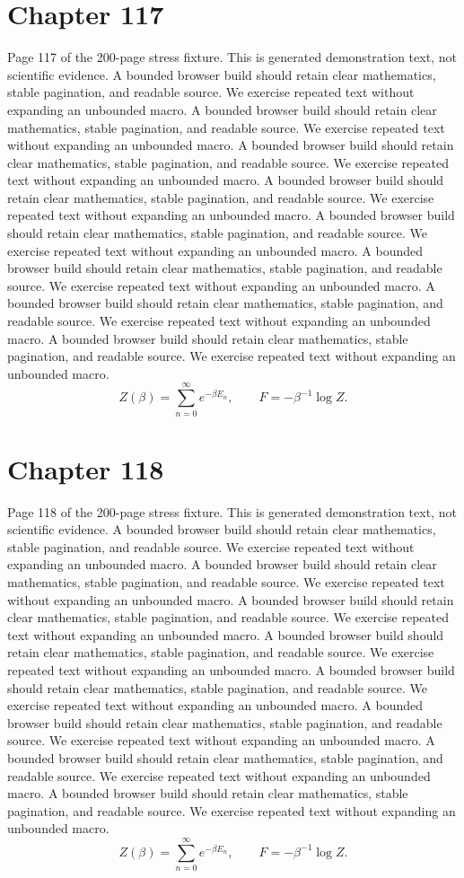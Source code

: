 \documentclass[11pt]{article}
\begin{document}
\section*{Chapter 117}
Page 117 of the 200-page stress fixture. This is generated demonstration text, not scientific evidence.
A bounded browser build should retain clear mathematics, stable pagination, and readable source. We exercise repeated text without expanding an unbounded macro.
A bounded browser build should retain clear mathematics, stable pagination, and readable source. We exercise repeated text without expanding an unbounded macro.
A bounded browser build should retain clear mathematics, stable pagination, and readable source. We exercise repeated text without expanding an unbounded macro.
A bounded browser build should retain clear mathematics, stable pagination, and readable source. We exercise repeated text without expanding an unbounded macro.
A bounded browser build should retain clear mathematics, stable pagination, and readable source. We exercise repeated text without expanding an unbounded macro.
A bounded browser build should retain clear mathematics, stable pagination, and readable source. We exercise repeated text without expanding an unbounded macro.
A bounded browser build should retain clear mathematics, stable pagination, and readable source. We exercise repeated text without expanding an unbounded macro.
A bounded browser build should retain clear mathematics, stable pagination, and readable source. We exercise repeated text without expanding an unbounded macro.
\[Z(\beta)=\sum_{n=0}^{\infty}e^{-\beta E_n},\qquad F=-\beta^{-1}\log Z.\]
\newpage
\section*{Chapter 118}
Page 118 of the 200-page stress fixture. This is generated demonstration text, not scientific evidence.
A bounded browser build should retain clear mathematics, stable pagination, and readable source. We exercise repeated text without expanding an unbounded macro.
A bounded browser build should retain clear mathematics, stable pagination, and readable source. We exercise repeated text without expanding an unbounded macro.
A bounded browser build should retain clear mathematics, stable pagination, and readable source. We exercise repeated text without expanding an unbounded macro.
A bounded browser build should retain clear mathematics, stable pagination, and readable source. We exercise repeated text without expanding an unbounded macro.
A bounded browser build should retain clear mathematics, stable pagination, and readable source. We exercise repeated text without expanding an unbounded macro.
A bounded browser build should retain clear mathematics, stable pagination, and readable source. We exercise repeated text without expanding an unbounded macro.
A bounded browser build should retain clear mathematics, stable pagination, and readable source. We exercise repeated text without expanding an unbounded macro.
A bounded browser build should retain clear mathematics, stable pagination, and readable source. We exercise repeated text without expanding an unbounded macro.
\[Z(\beta)=\sum_{n=0}^{\infty}e^{-\beta E_n},\qquad F=-\beta^{-1}\log Z.\]
\newpage
\end{document}
